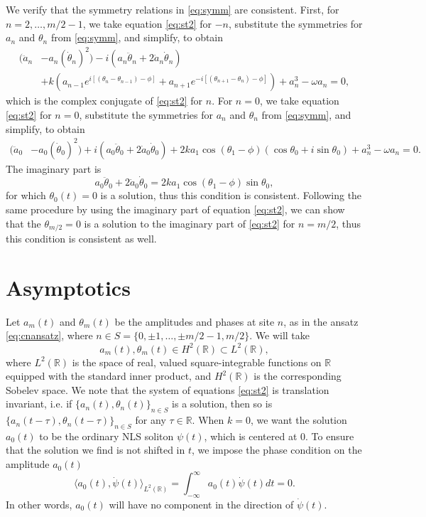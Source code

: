 \documentclass[11pt,reqno]{amsart}
\def\R{{\mathbb R}}
\begin{document}
We verify that the symmetry relations in \cref{eq:symm} are consistent. First, for $n = 2, \dots, m/2-1$, we take equation \cref{eq:st2} for $-n$, substitute the symmetries for $a_n$ and $\theta_n$ from \cref{eq:symm}, and simplify, to obtain 
\begin{equation*}
\begin{aligned}
(\ddot a_n &- a_n (\dot \theta_n)^2) 
- i ( a_n \ddot\theta_n + 2 \dot a_n \dot \theta_n )\\
&+ k\left(a_{n-1}e^{i[(\theta_n - \theta_{n-1}) - \phi]} + a_{n+1}e^{-i[(\theta_{n+1} - \theta_{n}) - \phi]} \right)+a_n^3 - \omega a_n = 0,
\end{aligned}
\end{equation*}	
which is the complex conjugate of \cref{eq:st2} for $n$. For $n = 0$, we take equation \cref{eq:st2} for $n=0$, substitute the symmetries for $a_n$ and $\theta_n$ from \cref{eq:symm}, and simplify, to obtain 
\begin{equation*}
\begin{aligned}
(\ddot a_0 &- a_0 (\dot \theta_0)^2) 
+ i ( a_0 \ddot\theta_0 + 2 \dot a_0 \dot \theta_0 )
+ 2 k a_1 \cos(\theta_1 - \phi)(\cos \theta_0 + i \sin \theta_0) + a_n^3 - \omega a_n = 0.
\end{aligned}
\end{equation*}
The imaginary part is
\begin{equation}\label{eq:n0imagpart}
a_0 \ddot\theta_0 + 2 \dot a_0 \dot \theta_0 = 2 k a_1 \cos(\theta_1 - \phi) \sin \theta_0,
\end{equation}
for which $\theta_0(t) = 0$ is a solution, thus this condition is consistent. Following the same procedure by using the imaginary part of equation \cref{eq:st2}, we can show that the $\theta_{m/2} = 0$ is a solution to the imaginary part of \cref{eq:st2} for $n=m/2$, thus this condition is consistent as well.

\section{Asymptotics}

Let $a_m(t)$ and $\theta_m(t)$ be the amplitudes and phases at site $n$, as in the ansatz \cref{eq:cnansatz}, where $n \in S = \{ 0, \pm 1, \dots, \pm m/2-1, m/2 \}$. We will take 
\[
a_m(t), \theta_m(t) \in H^2(\R) \subset L^2(\R),
\]
where $L^2(\R)$ is the space of real, valued square-integrable functions on $\R$ equipped with the standard inner product, and $H^2(\R)$ is the corresponding Sobelev space. We note that the system of equations \cref{eq:st2} is translation invariant, i.e. if $\{ a_n(t), \theta_n(t)\}_{n\in S}$ is a solution, then so is $\{ a_n(t-\tau), \theta_n(t-\tau)\}_{n\in S}$ for any $\tau \in \R$. When $k = 0$, we want the solution $a_0(t)$ to be the ordinary NLS soliton $\psi(t)$, which is centered at 0. To ensure that the solution we find is not shifted in $t$, we impose the phase condition on the amplitude $a_0(t)$
\begin{equation}\label{eq:phasecond}
\langle a_0(t), \dot{\psi}(t) \rangle_{L^2(\R)} = \int_{-\infty}^\infty a_0(t) \dot{\psi}(t) dt = 0.
\end{equation}
In other words, $a_0(t)$ will have no component in the direction of $\dot{\psi}(t)$.
\end{document}
